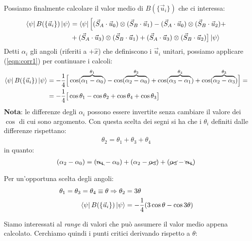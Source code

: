 \documentclass[../../FisicaTeorica.tex]{subfiles}
\begin{document}
Possiamo finalmente calcolare il valor medio di $B(\{\vec{u}_i\})$ che ci interessa:
\begin{align*}
\Bra{\psi}B(\{\vec{u}_i\})\Ket{\psi} &= \Bra{\psi} \Big[
(\vec{S}_A \cdot \vec{u}_0) \otimes (\vec{S}_B \cdot \vec{u}_1) - (\vec{S}_A \cdot \vec{u}_0 ) \otimes (\vec{S}_B \cdot \vec{u}_2) +\\
&+(\vec{S}_A \cdot \vec{u}_3) \otimes (\vec{S}_B \cdot \vec{u}_1) + (\vec{S}_A \cdot \vec{u}_3)\otimes (\vec{S}_B \cdot \vec{u}_2)\big] \Ket{\psi}
\end{align*}
Detti $\alpha_i$ gli angoli (riferiti a $+\hat{x}$) che definiscono i $\vec{u}_i$ unitari, possiamo applicare (\ref{eqn:corr1}) per continuare i calcoli:
\begin{align*}
\Bra{\psi}B(\{\vec{u}_i\})\Ket{\psi} &= -\frac{1}{4}\Big[\cos(\overbrace{\alpha_1-\alpha_0}^{\theta_1})-\cos(\overbrace{\alpha_2-\alpha_0}^{\theta_2}) + \cos(\overbrace{\alpha_3-\alpha_1}^{\theta_4}) + \cos(\overbrace{\alpha_2-\alpha_3}^{\theta_3})\Big]=\\
&= -\frac{1}{4}\big[\cos \theta_1 -\cos\theta_2 + \cos\theta_4 +\cos\theta_3\big]
\end{align*}
\textbf{Nota}: le differenze degli $\alpha_i$ possono essere invertite senza cambiare il valore dei $\cos$ di cui sono argomento. Con questa scelta dei segni si ha che i $\theta_i$ definiti dalle differenze rispettano:
\begin{align*}
\theta_2 = \theta_1 + \theta_3 + \theta_4
\end{align*}
in quanto:
\begin{align*}
    (\alpha_2 - \alpha_0) = (\bcancel{\alpha_1} - \alpha_0) + (\alpha_2 -\cancel{\alpha_3}) + (\cancel{\alpha_3} - \bcancel{\alpha_1})
\end{align*}

Per un'opportuna scelta degli angoli: 
\begin{align*}
\theta_1 = \theta_3 = \theta_4  \equiv \theta \Rightarrow  \theta_2 &= 3\theta\\
 \Bra{\psi}B(\{\vec{u}_i\})\Ket{\psi}&=-\frac{1}{4}(3\cos\theta - \cos 3\theta)
\end{align*}

Siamo interessati al \textit{range} di valori che può assumere il valor medio appena calcolato. Cerchiamo quindi i punti critici derivando rispetto a $\theta$:
\end{document}
